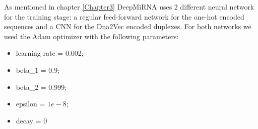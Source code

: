 As mentioned in chapter \ref{Chapter3} DeepMiRNA uses 2 different neural network for the training stage: a regular feed-forward network for the one-hot encoded sequences and a CNN for the Dna2Vec encoded duplexes. For both networks we used the Adam optimizer with the following parameters:

\begin{itemize}
	\item learning rate = 0.002;
	\item beta\_1 = 0.9;
	\item beta\_2 = 0.999;
	\item epsilon = $1e-8$;
	\item decay = 0
\end{itemize}

\subsection{}   